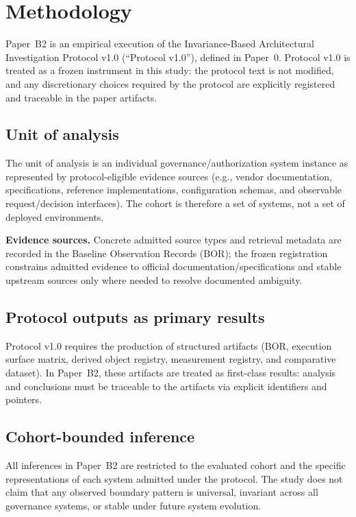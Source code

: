 \section{Methodology}
\label{sec:methodology}
Paper~B2 is an empirical execution of the Invariance-Based Architectural Investigation Protocol v1.0 (``Protocol v1.0''), defined in Paper~0. Protocol v1.0 is treated as a frozen instrument in this study: the protocol text is not modified, and any discretionary choices required by the protocol are explicitly registered and traceable in the paper artifacts.

\subsection{Unit of analysis}
The unit of analysis is an individual governance/authorization system instance as represented by protocol-eligible evidence sources (e.g., vendor documentation, specifications, reference implementations, configuration schemas, and observable request/decision interfaces). The cohort is therefore a set of systems, not a set of deployed environments.

\textbf{Evidence sources.} Concrete admitted source types and retrieval metadata are recorded in the Baseline Observation Records (BOR); the frozen registration constrains admitted evidence to official documentation/specifications and stable upstream sources only where needed to resolve documented ambiguity.

\subsection{Protocol outputs as primary results}
Protocol v1.0 requires the production of structured artifacts (BOR, execution surface matrix, derived object registry, measurement registry, and comparative dataset). In Paper~B2, these artifacts are treated as first-class results: analysis and conclusions must be traceable to the artifacts via explicit identifiers and pointers.

\subsection{Cohort-bounded inference}
All inferences in Paper~B2 are restricted to the evaluated cohort and the specific representations of each system admitted under the protocol. The study does not claim that any observed boundary pattern is universal, invariant across all governance systems, or stable under future system evolution.

